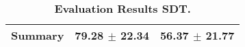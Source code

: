 \begin{table}[htb]
{\begin{tabular}{lll}
\midrule
\textbf{Summary                                  } &                  \phantom{0}79.28 $\pm$ 22.34 &                      \phantom{0}56.37 $\pm$ 21.77 \\
\bottomrule
\end{tabular}%
}
\caption{\textbf{Evaluation Results SDT.}}
\label{tab:eval-results}
\end{table}
